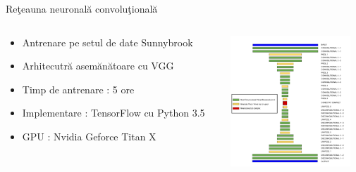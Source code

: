 \documentclass[xcolor=svgnames,handout]{beamer}
\begin{document}
  \begin{frame}
    {Re\c{t}eauna neuronal\u{a} convolu\c{t}ional\u{a}}
    
    \begin{columns}[T]
    \begin{column}{.48\textwidth}
        \begin{itemize}
        \item Antrenare pe setul de date Sunnybrook
        \item Arhitecutr\u{a} asem\u{a}n\u{a}toare cu VGG
        \item Timp de antrenare : 5 ore
        \item Implementare : TensorFlow cu Python 3.5
        \item GPU : Nvidia Geforce Titan X
        \end{itemize}
    \end{column}%
    \hfill%
    \begin{column}{.48\textwidth}
    
    \begin{center}
        \includegraphics[width=170]{arhitectura_segmentor.png}  
    \end{center}
    \end{column}%
    \end{columns}
    
  \end{frame}
  
\end{document}
